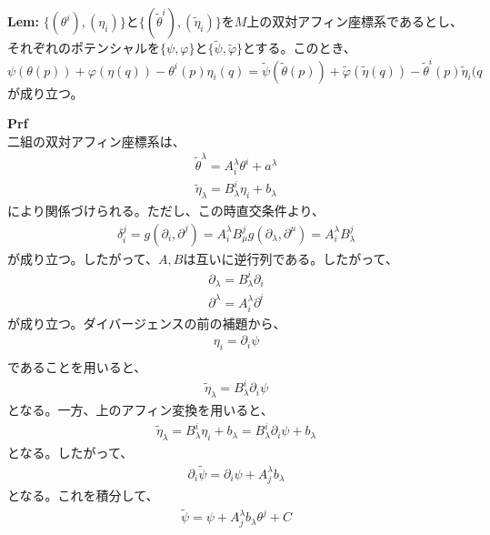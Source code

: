 \documentclass[a4paper,11pt]{jsarticle}
\numberwithin{equation}{section}
\begin{document}
\begin{itembox}[l]{\textbf{Lem:}}
    $\{(\theta ^i),(\eta_i)\}$と$\{(\tilde{\theta} ^i),(\tilde{\eta}_i)\}$を$M$上の双対アフィン座標系であるとし、それぞれのポテンシャルを$\{\psi,\varphi\}$と$\{\tilde{\psi},\tilde{\varphi}\}$とする。このとき、
    \begin{equation}
        \psi(\theta(p)) + \varphi(\eta(q)) - \theta^i(p)\eta_i(q) = \tilde{\psi}(\tilde{\theta}(p)) + \tilde{\varphi}(\tilde{\eta}(q)) - \tilde{\theta}^i(p)\tilde{\eta}_i(q
    \end{equation}
    が成り立つ。
\end{itembox}
\textbf{Prf}\\
二組の双対アフィン座標系は、
\begin{align}
    \tilde{\theta}^\lambda = A_i^\lambda \theta^i + a^\lambda\\
    \tilde{\eta}_\lambda = B^i_\lambda \eta_i + b_\lambda
\end{align}
により関係づけられる。ただし、この時直交条件より、
\begin{align}
    \delta_i^j =g(\partial_i,\partial^j) = A_i^\lambda B^j_\mu g(\partial_\lambda,\partial^{\mu}) = A_i^\lambda B^j_\lambda
\end{align}
が成り立つ。したがって、$A,B$は互いに逆行列である。したがって、
\begin{align}
    \partial_\lambda = B_\lambda^i \partial_i\\
    \partial^{\lambda} = A^\lambda_i \partial^i
\end{align}
が成り立つ。ダイバージェンスの前の補題から、
\begin{align}
    \eta_i = \partial_i \psi\\
\end{align}
であることを用いると、
\begin{align}
    \tilde{\eta}_\lambda = B^i_\lambda \partial_i \psi
\end{align}
となる。一方、上のアフィン変換を用いると、
\begin{align}
    \tilde{\eta}_\lambda = B^i_\lambda \eta_i + b_\lambda = B^i_\lambda \partial_i \psi + b_\lambda
\end{align}
となる。したがって、
\begin{align}
    \partial_i \tilde{\psi} = \partial_i \psi +A^\lambda_j b_\lambda
\end{align}
となる。これを積分して、
\begin{align}
    \tilde{\psi} = \psi + A^\lambda_j b_\lambda \theta^j +C
\end{align}
\end{document}
